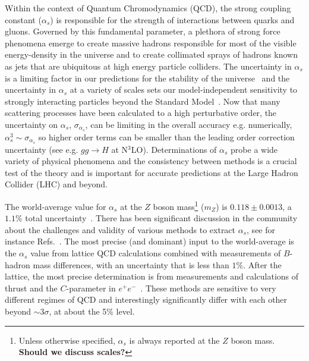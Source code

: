 



Within the context of Quantum Chromodynamics (QCD), the strong
coupling constant ($\alpha_s$) is responsible for the strength of
interactions between quarks and gluons.  Governed by this fundamental
parameter, a plethora of strong force phenomena emerge to create
massive hadrons responsible for most of the visible energy-density in
the universe and to create collimated sprays of hadrons known as jets
that are ubiquitous at high energy particle colliders.  The
uncertainty in $\alpha_s$ is a limiting factor in our predictions for
the stability of the universe~\cite{Andreassen:2017rzq} and the
uncertainty in $\alpha_s$ at a variety of scales sets our
model-independent sensitivity to strongly interacting particles beyond
the Standard Model~\cite{Kaplan:2008pt,Becciolini:2014lya}.  Now that
many scattering processes have been calculated to a high perturbative
order, the uncertainty on $\alpha_s$, $\sigma_{\alpha_s}$, can be
limiting in the overall accuracy e.g. numerically,
$\alpha_s^3\sim \sigma_{\alpha_s}$ so higher order terms can be
smaller than the leading order correction uncertainty (see
e.g. $gg\rightarrow H$ at N$^3$LO).  Determinations of $\alpha_s$
probe a wide variety of physical phenomena and the consistency between
methods is a crucial test of the theory and is important for accurate
predictions at the Large Hadron Collider (LHC) and beyond.


The world-average value for $\alpha_s$ at the $Z$ boson mass\footnote{Unless otherwise specified, $\alpha_s$ is always reported at the $Z$ boson mass.  \textbf{Should we discuss scales?}} ($m_Z$) is $0.118\pm 0.0013$, a $1.1\%$ total uncertainty~\cite{Olive:2016xmw}.  There has been significant discussion in the community about the challenges and validity of various methods to extract $\alpha_s$, see for instance Refs.~\cite{Bethke:2011tr,Pich:2013sqa,Moch:2014tta,dEnterria:2015kmd,Olive:2016xmw,Salam:2017qdl,Altarelli:2013bpa}.  The most precise (and dominant) input to the world-average is the $\alpha_s$ value from lattice QCD calculations combined with measurements of $B$-hadron mass differences, with an uncertainty that is less than $1\%$.   After the lattice, the most precise determination is from measurements and calculations of thrust and the $C$-parameter in $e^+e^-$~\cite{Abbate:2010xh,Hoang:2015hka,Heister:2003aj,Abdallah:2004xe,Abreu:1996mk,Abreu:1999rc,Biebel:1999zt,Adeva:1992gv,Abbiendi:2004qz,Abe:1994mf}.   These methods are sensitive to very different regimes of QCD and interestingly significantly differ with each other beyond $\sim 3\sigma$, at about the 5\% level.  

